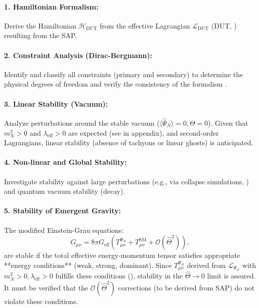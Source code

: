\documentclass[11pt, a4paper]{article}
\theoremstyle{remark}
\newcommand{\Op}[1]{\hat{#1}}
\begin{document}
\paragraph{1. Hamiltonian Formalism:} Derive the Hamiltonian \( \mathcal{H}_{\text{DUT}} \) from the effective Lagrangian \( \mathcal{L}_{\text{DUT}} \) (DUT, ) resulting from the SAP.

\paragraph{2. Constraint Analysis (Dirac-Bergmann):} Identify and classify all constraints (primary and secondary) to determine the physical degrees of freedom and verify the consistency of the formalism \citep{HenneauxTeitelboim1992}.

\paragraph{3. Linear Stability (Vacuum):} Analyze perturbations around the stable vacuum (\( \langle \Op{\Psi}_N \rangle = 0, \Theta = 0 \)). Given that \( m_N^2 > 0 \) and \( \lambda_{\text{eff}} > 0 \) are expected (see  in appendix), and second-order Lagrangians, linear stability (absence of tachyons or linear ghosts) is anticipated.

\paragraph{4. Non-linear and Global Stability:} Investigate stability against large perturbations (e.g., via collapse simulations, ) and quantum vacuum stability (decay).

\paragraph{5. Stability of Emergent Gravity:} The modified Einstein-Grau equations:
\[
G_{\mu\nu} = 8\pi G_{\text{eff}} \left( T_{\mu\nu}^{\Psi_N} + T_{\mu\nu}^{\text{SM}} + \mathcal{O}(\Op{\Theta}^2) \right),
\]
are stable if the total effective energy-momentum tensor satisfies appropriate **energy conditions** (weak, strong, dominant). Since \( T_{\mu\nu}^{\Psi_N} \) derived from \( \mathcal{L}_{\Psi_N} \) with \(m_N^2>0, \lambda_{\text{eff}}>0\) fulfills these conditions (), stability in the \( \Op{\Theta} \to 0 \) limit is assured. It must be verified that the \( \mathcal{O}(\Op{\Theta}^2) \) corrections (to be derived from SAP) do not violate these conditions.
\end{document}
